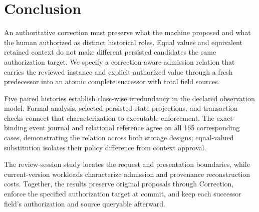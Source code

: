 \section{Conclusion}
\label{sec:conclusion}

An authoritative correction must preserve what the machine proposed and what the human authorized as distinct historical roles. Equal values and equivalent retained context do not make different persisted candidates the same authorization target. We specify a correction-aware admission relation that carries the reviewed instance and explicit authorized value through a fresh predecessor into an atomic complete successor with total field sources.

Five paired histories establish class-wise irredundancy in the declared observation model. Formal analysis, selected persisted-state projections, and transaction checks connect that characterization to executable enforcement. The exact-binding event journal and relational reference agree on all 165 corresponding cases, demonstrating the relation across both storage designs; equal-valued substitution isolates their policy difference from context approval.

The review-session study locates the request and presentation boundaries, while current-version workloads characterize admission and provenance reconstruction costs. Together, the results preserve original proposals through Correction, enforce the specified authorization target at commit, and keep each successor field's authorization and source queryable afterward.
